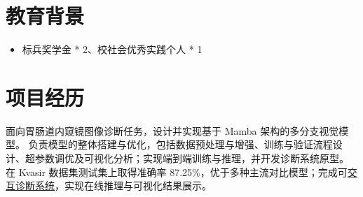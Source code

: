 \documentclass{resume}
\begin{document}




\sepspace
{}


\section{教育背景}
\begin{itemize}
  \item 标兵奖学金 * 2、校社会优秀实践个人 * 1
\end{itemize}


\section{项目经历}
\Content
{面向胃肠道内窥镜图像诊断任务，设计并实现基于 Mamba 架构的多分支视觉模型。}
{负责模型的整体搭建与优化，包括数据预处理与增强、训练与验证流程设计、超参数调优及可视化分析；实现端到端训练与推理，并开发诊断系统原型。}
{在 Kvasir 数据集测试集上取得准确率 87.25\%，优于多种主流对比模型；完成可{\href{https://github.com/Shr1mpTop/Gastrointestinal-Diagnosis-System}{交互诊断系统}}，实现在线推理与可视化结果展示。}
\end{document}
